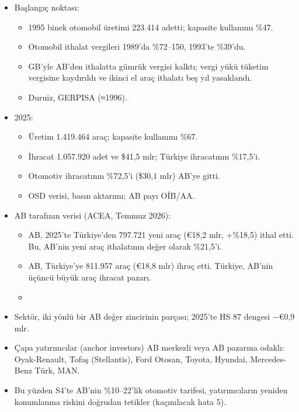\begin{itemize}
\tightlist
\item
  Başlangıç noktası:

  \begin{itemize}
  \tightlist
  \item
    1995 binek otomobil üretimi 223.414 adetti; kapasite kullanımı \%47.
  \item
    Otomobil ithalat vergileri 1989'da \%72--150, 1993'te \%39'du.
  \item
    GB'yle AB'den ithalatta gümrük vergisi kalktı; vergi yükü tüketim vergisine kaydırıldı ve ikinci el araç ithalatı beş yıl yasaklandı.
  \item
    \etiketV{} Duruiz, GERPISA (≈1996).
  \end{itemize}
\item
  2025:

  \begin{itemize}
  \tightlist
  \item
    Üretim 1.419.464 araç; kapasite kullanımı \%67.
  \item
    İhracat 1.057.920 adet ve \$41,5 mlr; Türkiye ihracatının \%17,5'i.
  \item
    Otomotiv ihracatının \%72,5'i (\$30,1 mlr) AB'ye gitti.
  \item
    \etiketV{} OSD verisi, basın aktarımı; AB payı \etiketD{} OİB/AA.
  \end{itemize}
\item
  AB tarafının verisi (ACEA, Temmuz 2026):

  \begin{itemize}
  \tightlist
  \item
    AB, 2025'te Türkiye'den 797.721 yeni araç (€18,2 mlr, +\%18,5) ithal etti. Bu, AB'nin yeni araç ithalatının değer olarak \%21,5'i.
  \item
    AB, Türkiye'ye 811.957 araç (€18,8 mlr) ihraç etti. Türkiye, AB'nin üçüncü büyük araç ihracat pazarı.
  \item
    \etiketV{}
  \end{itemize}
\item
  Sektör, iki yönlü bir AB değer zincirinin parçası; 2025'te HS 87 dengesi −€0,9 mlr.
\item
  Çapa yatırımcılar (anchor investors) AB merkezli veya AB pazarına odaklı: Oyak-Renault, Tofaş (Stellantis), Ford Otosan, Toyota, Hyundai, Mercedes-Benz Türk, MAN.
\item
  Bu yüzden S4'te AB'nin \%10--22'lik otomotiv tarifesi, yatırımcıların yeniden konumlanma riskini doğrudan tetikler (kaçınılacak hata 5).
\end{itemize}

